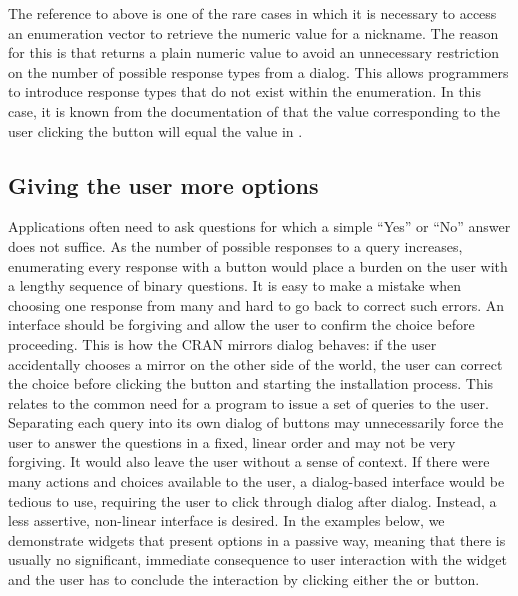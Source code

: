 \documentclass[article,shortnames]{jss}
\begin{document}
The reference to  above is one of the rare cases
in which it is necessary to access an enumeration vector to retrieve
the numeric value for a nickname. The reason for this is that
 returns a plain numeric value to avoid an
unnecessary restriction on the number of possible response types from
a dialog. This allows programmers to introduce response types that do
not exist within the  enumeration.
In this case, it is known from the documentation of
 that the value corresponding to the user
clicking the  button will equal the  value in
.

\subsection{Giving the user more options}


Applications often need to ask questions for which a simple ``Yes'' or
``No'' answer does not suffice. As the number of possible responses to
a query increases, enumerating every response with a button would
place a burden on the user with a lengthy sequence of binary
questions.  It is easy to make a mistake when choosing one response
from many and hard to go back to correct such errors. An interface
should be forgiving and allow the user to confirm the choice before
proceeding.  This is how the CRAN mirrors dialog behaves: if the user
accidentally chooses a mirror on the other side of the world, the user
can correct the choice before clicking the  button and
starting the installation process. This relates to the common need for
a program to issue a set of queries to the user. Separating each query
into its own dialog of buttons may unnecessarily force the user to
answer the questions in a fixed, linear order and may not be very
forgiving. It would also leave the user without a sense of context. If
there were many actions and choices available to the user, a
dialog-based interface would be tedious to use, requiring the user to
click through dialog after dialog. Instead, a less assertive,
non-linear interface is desired. In the examples below, we demonstrate
widgets that present options in a passive way, meaning that there is
usually no significant, immediate consequence to user interaction with
the widget and the user has to conclude the interaction by clicking
either the  or  button.
\end{document}
